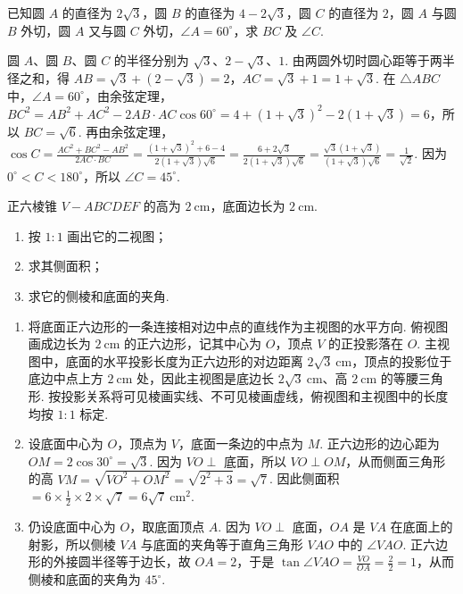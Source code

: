 \begin{problem}
已知圆 \(A\) 的直径为 \(2\sqrt{3}\)，圆 \(B\) 的直径为 \(4-2\sqrt{3}\)，圆 \(C\) 的直径为 \(2\)，圆 \(A\) 与圆 \(B\) 外切，圆 \(A\) 又与圆 \(C\) 外切，\(\angle A=60^\circ\)，求 \(BC\) 及 \(\angle C\).
\end{problem}

\begin{solution}
圆 \(A\)、圆 \(B\)、圆 \(C\) 的半径分别为 \(\sqrt3\)、\(2-\sqrt3\)、\(1\). 由两圆外切时圆心距等于两半径之和，得 \(AB=\sqrt3+(2-\sqrt3)=2\)，\(AC=\sqrt3+1=1+\sqrt3\). 在 \(\triangle ABC\) 中，\(\angle A=60^\circ\)，由余弦定理，\(BC^2=AB^2+AC^2-2AB\cdot AC\cos60^\circ=4+(1+\sqrt3)^2-2(1+\sqrt3)=6\)，所以 \(BC=\sqrt6\). 再由余弦定理，\(\cos C=\frac{AC^2+BC^2-AB^2}{2AC\cdot BC}=\frac{(1+\sqrt3)^2+6-4}{2(1+\sqrt3)\sqrt6}=\frac{6+2\sqrt3}{2(1+\sqrt3)\sqrt6}=\frac{\sqrt3(1+\sqrt3)}{(1+\sqrt3)\sqrt6}=\frac{1}{\sqrt2}\). 因为 \(0^\circ<C<180^\circ\)，所以 \(\angle C=45^\circ\).
\end{solution}

\begin{problem}
正六棱锥 \(V-ABCDEF\) 的高为 \(2 \mathrm{~cm}\)，底面边长为 \(2 \mathrm{~cm}\).

\begin{enumerate}
\item 按 \(1:1\) 画出它的二视图；
\item 求其侧面积；
\item 求它的侧棱和底面的夹角.
\end{enumerate}
\end{problem}

\begin{solution}
\begin{enumerate}
\item 将底面正六边形的一条连接相对边中点的直线作为主视图的水平方向. 俯视图画成边长为 \(2\mathrm{~cm}\) 的正六边形，记其中心为 \(O\)，顶点 \(V\) 的正投影落在 \(O\). 主视图中，底面的水平投影长度为正六边形的对边距离 \(2\sqrt3\mathrm{~cm}\)，顶点的投影位于底边中点上方 \(2\mathrm{~cm}\) 处，因此主视图是底边长 \(2\sqrt3\mathrm{~cm}\)、高 \(2\mathrm{~cm}\) 的等腰三角形. 按投影关系将可见棱画实线、不可见棱画虚线，俯视图和主视图中的长度均按 \(1:1\) 标定.

\item 设底面中心为 \(O\)，顶点为 \(V\)，底面一条边的中点为 \(M\). 正六边形的边心距为 \(OM=2\cos30^\circ=\sqrt3\). 因为 \(VO\perp\) 底面，所以 \(VO\perp OM\)，从而侧面三角形的高 \(VM=\sqrt{VO^2+OM^2}=\sqrt{2^2+3}=\sqrt7\). 因此侧面积 \(=6\times\frac{1}{2}\times2\times\sqrt7=6\sqrt7\mathrm{~cm}^2\).

\item 仍设底面中心为 \(O\)，取底面顶点 \(A\). 因为 \(VO\perp\) 底面，\(OA\) 是 \(VA\) 在底面上的射影，所以侧棱 \(VA\) 与底面的夹角等于直角三角形 \(VAO\) 中的 \(\angle VAO\). 正六边形的外接圆半径等于边长，故 \(OA=2\)，于是 \(\tan\angle VAO=\frac{VO}{OA}=\frac{2}{2}=1\)，从而侧棱和底面的夹角为 \(45^\circ\).
\end{enumerate}
\end{solution}

